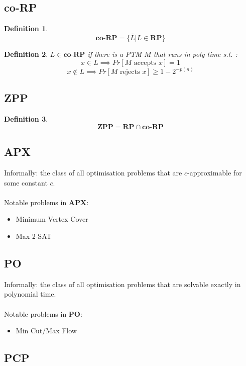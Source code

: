 \documentclass[]{article}
\theoremstyle{break}
\theoremstyle{break}
\newtheorem{definition}{Definition}[section]
\begin{document}
\subsection{co-RP}
\label{sec:co-rp}
\begin{definition}
	$$\textbf{co-RP} = \{\bar{L}| L\in \hyperref[sec:rp]{\textbf{RP}} \}$$
\end{definition}
\begin{definition}
	$L\in \textbf{co-RP}$ if there is a PTM $M$ that runs in poly time s.t. :
	$$x \in L \implies 	Pr[M \text{ accepts } x] = 1$$
	$$x \notin L \implies 	Pr[M \text{ rejects } x] \geq 1 - 2^{-p(n)}$$
\end{definition}
\subsection{ZPP}
\label{sec:zpp}
\begin{definition}
	$$\textbf{ZPP} = \hyperref[sec:rp]{\textbf{RP}} \cap \hyperref[sec:co-rp]{\textbf{co-RP}}$$
\end{definition}

\subsection{APX} \label{sec:APX}

Informally: the class of all optimisation problems that are $c$-approximable for some constant $c$.
\\
\\
Notable problems in $\mathbf{APX}$:
\begin{itemize}
	\item Minimum Vertex Cover
	\item Max 2-SAT
\end{itemize}

\subsection{PO} \label{sec:PO}

Informally: the class of all optimisation problems that are solvable exactly in polynomial time.
\\
\\
Notable problems in $\mathbf{PO}$:
\begin{itemize}
	\item Min Cut/Max Flow
\end{itemize}

\subsection{PCP}
\end{document}
